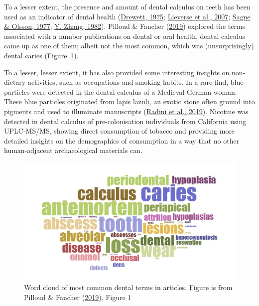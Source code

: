 \documentclass[
  letterpaper,
]{book}
\begin{document}
To a lesser extent, the presence and amount of dental calculus on teeth
has been used as an indicator of dental health
(\protect\hyperlink{ref-drewettExcavationOval1975}{Drewett, 1975};
\protect\hyperlink{ref-lieverseDentalHealth2007}{Lieverse et al., 2007};
\protect\hyperlink{ref-sagneStudiesPeriodontal1977}{Sagne \& Olsson,
1977}; \protect\hyperlink{ref-zhangDentalDisease1982}{Y. Zhang, 1982}).
Pilloud \& Fancher
(\protect\hyperlink{ref-pilloudOutliningDefinition2019}{2019}) explored
the terms associated with a number publications on dental or oral
health, dental calculus came up as one of them; albeit not the most
common, which was (unsurprisingly) dental caries
(Figure~\ref{fig-dental-terms}).

To a lesser, lesser extent, it has also provided some interesting
insights on non-dietary activities, such as occupations and smoking
habits. In a rare find, blue particles were detected in the dental
calculus of a Medieval German woman. These blue particles originated
from lapis lazuli, an exotic stone often ground into pigments and used
to illuminate manuscripts
(\protect\hyperlink{ref-radiniMedievalWomen2019}{Radini et al., 2019}).
Nicotine was detected in dental calculus of pre-colonisation individuals
from California using UPLC-MS/MS, showing direct consumption of tobacco
and providing more detailed insights on the demographics of consumption
in a way that no other human-adjacent archaeological materials can.

\begin{figure}

{\centering \includegraphics{figures/wordcloud.png}

}

\caption{\label{fig-dental-terms}Word cloud of most common dental terms
in articles. Figure is from Pilloud \& Fancher
(\protect\hyperlink{ref-pilloudOutliningDefinition2019}{2019}), Figure
1}

\end{figure}
\end{document}
